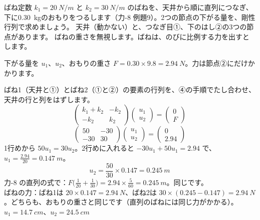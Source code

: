 \begin{phreidai}\label{ph:力-16:ex1}
ばね定数 $k_1=\qty{20}{N/m}$ と $k_2=\qty{30}{N/m}$ のばねを、天井から順に直列につなぎ、下に\qty{0.30}{kg}のおもりをつるします（力-8 例題9）。2つの節点の下がる量を、剛性行列で求めましょう。
\phbamen
天井（動かない）と、つなぎ目①、下のはし②の3つの節点があります。
\phmushi
ばねの重さを無視します。ばねは、のびに比例する力を出すとします。
\phzu
\noindent\begin{minipage}[c]{0.24\linewidth}\centering
{}
\end{minipage}\hfill
\begin{minipage}[c]{0.74\linewidth}\raggedright
下がる量を $u_1$、$u_2$、おもりの重さ $F=0.30\times9.8=\qty{2.94}{N}$。力は節点②にだけかかります。
\end{minipage}
\phriyu
ばね1（天井と①）とばね2（①と②）の要素の行列を、④の手順でたし合わせ、天井の行と列をはずします。
\phtateru
\[\begin{pmatrix}k_1+k_2&-k_2\\-k_2&k_2\end{pmatrix}\begin{pmatrix}u_1\\u_2\end{pmatrix}=\begin{pmatrix}0\\F\end{pmatrix}\]
\[\begin{pmatrix}50&-30\\-30&30\end{pmatrix}\begin{pmatrix}u_1\\u_2\end{pmatrix}=\begin{pmatrix}0\\2.94\end{pmatrix}\]
\phtoku
1行めから $50u_1=30u_2$。2行めに入れると $-30u_1+50u_1=2.94$ で、$u_1=\tfrac{2.94}{20}=\qty{0.147}{m}$。
\[u_2=\frac{50}{30}\times0.147=\qty{0.245}{m}\]
\phtashikame
力-8 の直列の式で：$F\bigl(\tfrac{1}{20}+\tfrac{1}{30}\bigr)=2.94\times\tfrac{5}{60}=\qty{0.245}{m}$。同じです。\\
ばねの力：ばね1は $20\times0.147=\qty{2.94}{N}$、ばね2は $30\times(0.245-0.147)=\qty{2.94}{N}$。どちらも、おもりの重さと同じです（直列のばねには同じ力がかかる）。
\kotae $u_1=\qty{14.7}{cm}$、$u_2=\qty{24.5}{cm}$
\end{phreidai}

